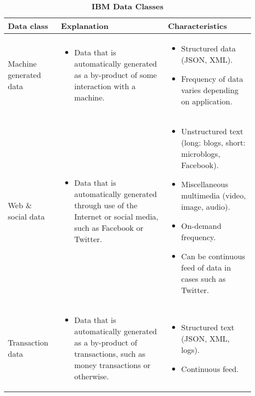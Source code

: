 \begin{landscape}

\begin{table}[H]
\footnotesize
\centering
\caption{\textbf{IBM Data Classes}}
\label{tab:ibm_data_tab}

\begin{tabular}{ | p{4cm} | p{10cm} | p{10cm} | }

\hline
\textbf{Data class}          &  \textbf{Explanation} & \textbf{Characteristics}   \\ \hline

Machine generated data
&
\begin{itemize}[leftmargin=*]
  \item Data that is automatically generated as a by-product of some interaction with a machine.
\end{itemize}
&
\begin{itemize}[leftmargin=*]
  \item Structured data (JSON, XML).
  \item Frequency of data varies depending on application.
\end{itemize}
\\ \hline

Web \& social data
&
\begin{itemize}[leftmargin=*]
  \item Data that is automatically generated through use of the Internet or social media, such as Facebook or Twitter.
\end{itemize}
&
\begin{itemize}[leftmargin=*]
  \item Unstructured text (long: blogs, short: microblogs, Facebook).
  \item Miscellaneous multimedia (video, image, audio).
  \item On-demand frequency.
  \item Can be continuous feed of data in cases such as Twitter.
\end{itemize}
\\ \hline

Transaction data
&
\begin{itemize}[leftmargin=*]
  \item Data that is automatically generated as a by-product of transactions, such as money transactions or otherwise.
\end{itemize}
&
\begin{itemize}[leftmargin=*]
  \item Structured text (JSON, XML, logs).
  \item Continuous feed.
\end{itemize}
\\ \hline


\end{tabular}
\end{table}
\end{landscape}
